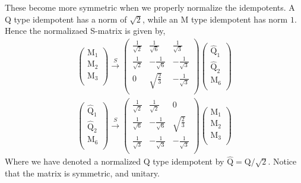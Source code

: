 \documentclass[12pt,a4paper]{article}
\newcounter{arrow}
\begin{document}
These become more symmetric when we properly normalize the idempotents. A Q type idempotent has a norm of $\sqrt{2}$, while an M type idempotent has norm $1$.
Hence the normalizaed S-matrix is given by,
\begin{align}\left( \begin{matrix}
\text{M}_1\\
\text{M}_2\\
\text{M}_3\\
\end{matrix} \right)
\xrightarrow{S}
\left( \begin{matrix}
\frac{1}{\sqrt{2}} & \frac{1}{\sqrt{6}} &  \frac{1}{\sqrt{3}} \\
\frac{1}{\sqrt{2}} & - \frac{1}{\sqrt{6}} & -\frac{1}{\sqrt{3}} \\
0& \sqrt{\frac{2}{3}} & -\frac{1}{\sqrt{3}} \\
\end{matrix} \right)
\left( \begin{matrix}
\widehat{\text{Q}}_1\\
\widehat{\text{Q}}_2\\
\text{M}_6\\
\end{matrix} \right)
\end{align}
\begin{align}
\left( \begin{matrix}
\widehat{\text{Q}}_1\\
\widehat{\text{Q}}_2\\
\text{M}_6\\
\end{matrix} \right)
\xrightarrow{S}
\left( \begin{matrix}
\frac{1}{\sqrt{2}}& \frac{1}{\sqrt{2}}& 0 \\
\frac{1}{\sqrt{6}} & - \frac{1}{\sqrt{6}} & \sqrt{\frac{2}{3}} \\
\frac{1}{\sqrt{3}} & - \frac{1}{\sqrt{3}} & - \frac{1}{\sqrt{3}} \\
\end{matrix} \right)
\left( \begin{matrix}
\text{M}_1\\
\text{M}_2\\
\text{M}_3\\
\end{matrix} \right)
\end{align}
Where we have denoted a normalized Q type idempotent by $\widehat{\text{Q}} = \text{Q}/\sqrt{2}$.
Notice that the matrix is symmetric, and unitary.
\end{document}
